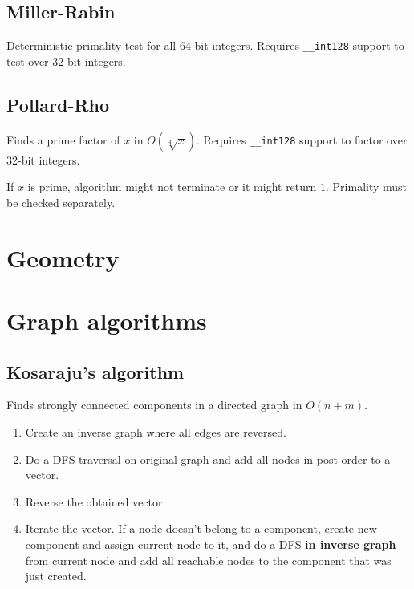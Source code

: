 \documentclass{article}
\begin{document}
\subsection {Miller-Rabin}

Deterministic primality test for all $64$-bit integers. Requires \verb|__int128| support to test over 32-bit integers.



\subsection {Pollard-Rho}

Finds a prime factor of $x$ in $O(\sqrt[4]{x})$. Requires \verb|__int128| support to factor over 32-bit integers.

If $x$ is prime, algorithm might not terminate or it might return $1$. Primality must be checked separately.



\section {Geometry}



\section {Graph algorithms}

\subsection {Kosaraju's algorithm}

Finds strongly connected components in a directed graph in $O(n + m)$.

\begin{enumerate}
	\item Create an inverse graph where all edges are reversed.
	\item Do a DFS traversal on original graph and add all nodes in post-order to a vector.
	\item Reverse the obtained vector.
	\item Iterate the vector. If a node doesn't belong to a component, create new component and assign current node to it, and do a DFS \textbf{in inverse graph} from current node and add all reachable nodes to the component that was just created.
\end{enumerate}
\end{document}
